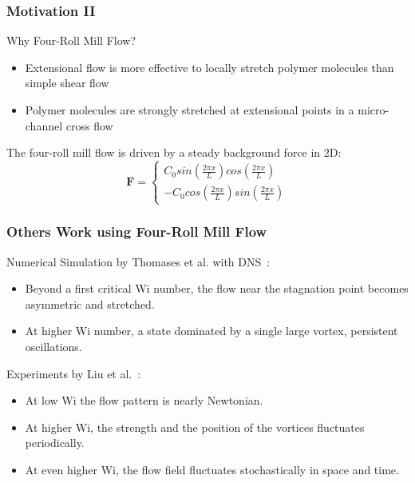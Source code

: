 \begin{frame}
  \frametitle{Motivation II}

  \begin{block}{Why Four-Roll Mill Flow?}
    \begin{itemize}
    \item Extensional flow is more effective to locally 
          stretch polymer molecules than simple shear flow
\item Polymer molecules are strongly stretched at extensional points in a micro-channel cross flow
    \end{itemize}

  \end{block}
The four-roll mill flow is driven by a steady background force in 2D:
\begin{equation}
\mathbf{F}=\left\{\begin{matrix}
C_0sin(\frac{2\pi x} {L})cos(\frac{2\pi x} {L})
\\ 
-C_0cos(\frac{2\pi x} {L})sin(\frac{2\pi x} {L})
\end{matrix}\right.
\end{equation}
\end{frame}

\begin{frame}
  \frametitle{Others Work using Four-Roll Mill Flow}
\begin{block}{Numerical Simulation by Thomases et al. with DNS~\footnotemark: }
\begin{itemize}
 \item Beyond a first critical Wi number, the flow near the stagnation point becomes asymmetric and stretched.
\item At higher Wi number, a state dominated by a single large vortex, persistent oscillations. 
\end{itemize}
\end{block}
\begin{block}{Experiments by Liu et al.~\footnotemark[2]:}
\begin{itemize}
 \item  At low Wi the flow pattern is nearly Newtonian. 
\item At higher Wi, the strength and the position of the vortices fluctuates periodically.
\item At even higher Wi, the flow field fluctuates stochastically in space and time.
\end{itemize}
\end{block}
\end{frame}

